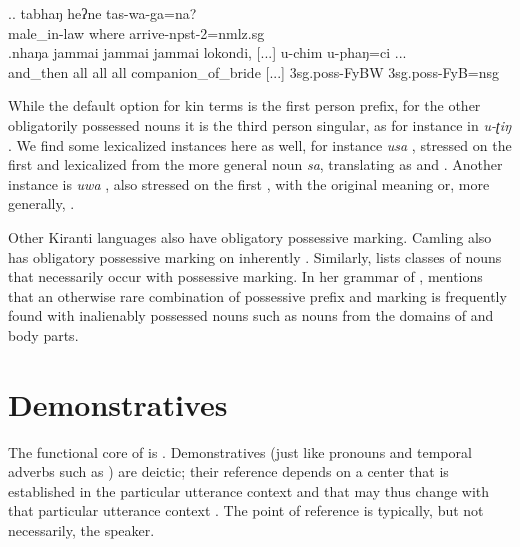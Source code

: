 \ex.\ag. tabhaŋ heʔne tas-wa-ga=na?\\
 	male\_in-law where arrive{\sc -npst-2=nmlz.sg}\\
\bg.nhaŋa   jammai jammai jammai lokondi,     [...] u-chim u-phaŋ=ci ... \\
and\_then all all all companion\_of\_bride [...] {\sc 3sg.poss-}FyBW {\sc 3sg.poss-}FyB{\sc =nsg}\\
 
	
\largerpage
While the default option for kin terms is the first person prefix, for the other obligatorily possessed nouns it is the third person singular, as for instance in \emph{u-ʈiŋ} . We find some lexicalized instances here as well, for instance \emph{usa} , stressed on the first  and lexicalized from the more general noun \emph{sa}, translating as  and . Another instance is \emph{uwa} , also stressed on the first , with the original meaning  or, more generally, . 

Other Kiranti languages also have obligatory possessive marking. Camling also has obligatory possessive marking on inherently  \citep[41]{Ebert1997Camling}. Similarly, \citet[98--100]{Doornenbal2009A-grammar} lists  classes of nouns that necessarily occur with possessive marking. In her grammar of , \citet[72]{Lahaussois2002Thulung} mentions that an otherwise rare combination of possessive prefix and  marking is frequently found with inalienably possessed nouns such as nouns from the domains of  and body parts.




\section{Demonstratives} \label{dem-pron}

The functional core of  is . Demonstratives (just like pronouns and temporal adverbs such as ) are deictic; their reference depends on a center that is established in the  particular utterance context and that may thus  change with that particular utterance context \citep{Buehler1934_Sprachtheorie, Fillmore1997_Deixis}. The point of reference is typically, but not necessarily, the speaker. 


